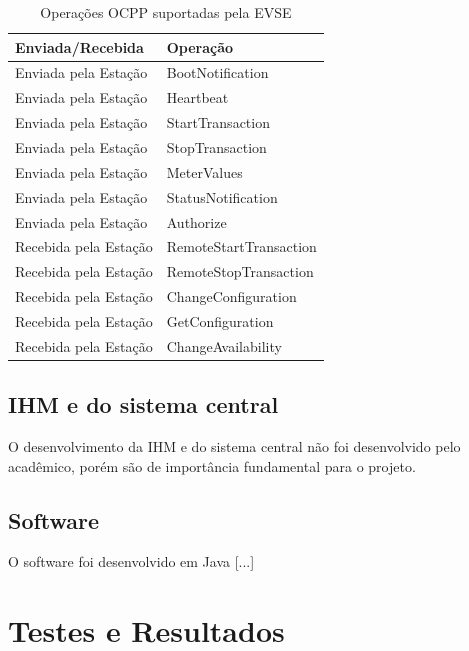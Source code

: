       \begin{table}[]
        \centering
        \caption{Operações OCPP suportadas pela \ac{EVSE}}
        \label{table:ocpp}
        \begin{tabular}{@{}ll@{}}
          \toprule
          \textbf{Enviada/Recebida} & \textbf{Operação}      \\ \midrule
            Enviada pela Estação      & BootNotification       \\
            Enviada pela Estação      & Heartbeat              \\
            Enviada pela Estação      & StartTransaction       \\
            Enviada pela Estação      & StopTransaction        \\
            Enviada pela Estação      & MeterValues            \\
            Enviada pela Estação      & StatusNotification     \\
            Enviada pela Estação      & Authorize              \\
            Recebida pela Estação     & RemoteStartTransaction \\
            Recebida pela Estação     & RemoteStopTransaction  \\
            Recebida pela Estação     & ChangeConfiguration    \\
            Recebida pela Estação     & GetConfiguration       \\
            Recebida pela Estação     & ChangeAvailability     \\ \bottomrule
        \end{tabular}
      \end{table}

    \subsection{IHM e do sistema central}

      O desenvolvimento da IHM e do sistema central não foi desenvolvido pelo acadêmico, porém são de importância fundamental para o projeto.

    \subsection{Software}

      O software foi desenvolvido em Java [...]

  \section{Testes e Resultados}

